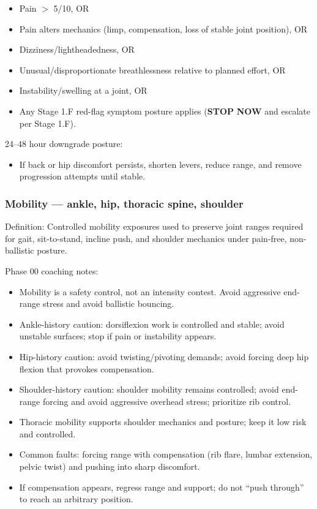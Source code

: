 \documentclass[10pt]{article}
\begin{document}
\begin{itemize}
\item Pain $>$ 5/10, OR
\item Pain alters mechanics (limp, compensation, loss of stable joint position), OR
\item Dizziness/lightheadedness, OR
\item Unusual/disproportionate breathlessness relative to planned effort, OR
\item Instability/swelling at a joint, OR
\item Any Stage 1.F red-flag symptom posture applies (\textbf{STOP} \textbf{NOW} and escalate per Stage 1.F).
\end{itemize}

24–48 hour downgrade posture:

\begin{itemize}
\item If back or hip discomfort persists, shorten levers, reduce range, and remove progression attempts until stable.
\end{itemize}

\subsubsection*{Mobility — ankle, hip, thoracic spine, shoulder}

Definition: Controlled mobility exposures used to preserve joint ranges required for gait, sit-to-stand, incline push, and shoulder mechanics under pain-free, non-ballistic posture.

Phase 00 coaching notes:

\begin{itemize}
\item Mobility is a safety control, not an intensity contest. Avoid aggressive end-range stress and avoid ballistic bouncing.
\item Ankle-history caution: dorsiflexion work is controlled and stable; avoid unstable surfaces; stop if pain or instability appears.
\item Hip-history caution: avoid twisting/pivoting demands; avoid forcing deep hip flexion that provokes compensation.
\item Shoulder-history caution: shoulder mobility remains controlled; avoid end-range forcing and avoid aggressive overhead stress; prioritize rib control.
\item Thoracic mobility supports shoulder mechanics and posture; keep it low risk and controlled.
\item Common faults: forcing range with compensation (rib flare, lumbar extension, pelvic twist) and pushing into sharp discomfort.
\item If compensation appears, regress range and support; do not “push through” to reach an arbitrary position.
\end{itemize}
\end{document}

